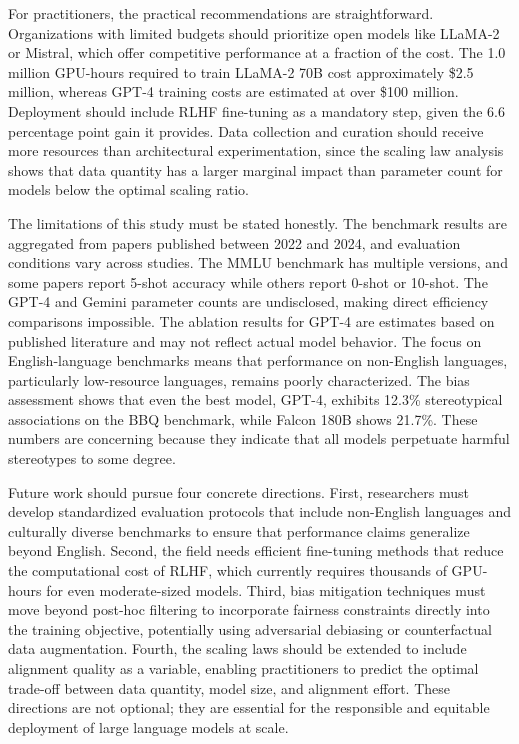 \documentclass[journal]{IEEEtran}
\begin{document}
For practitioners, the practical recommendations are straightforward. Organizations with limited budgets should prioritize open models like LLaMA-2 or Mistral, which offer competitive performance at a fraction of the cost. The 1.0 million GPU-hours required to train LLaMA-2 70B cost approximately \$2.5 million, whereas GPT-4 training costs are estimated at over \$100 million. Deployment should include RLHF fine-tuning as a mandatory step, given the 6.6 percentage point gain it provides. Data collection and curation should receive more resources than architectural experimentation, since the scaling law analysis shows that data quantity has a larger marginal impact than parameter count for models below the optimal scaling ratio.

The limitations of this study must be stated honestly. The benchmark results are aggregated from papers published between 2022 and 2024, and evaluation conditions vary across studies. The MMLU benchmark has multiple versions, and some papers report 5-shot accuracy while others report 0-shot or 10-shot. The GPT-4 and Gemini parameter counts are undisclosed, making direct efficiency comparisons impossible. The ablation results for GPT-4 are estimates based on published literature and may not reflect actual model behavior. The focus on English-language benchmarks means that performance on non-English languages, particularly low-resource languages, remains poorly characterized. The bias assessment shows that even the best model, GPT-4, exhibits 12.3\% stereotypical associations on the BBQ benchmark, while Falcon 180B shows 21.7\%. These numbers are concerning because they indicate that all models perpetuate harmful stereotypes to some degree.

Future work should pursue four concrete directions. First, researchers must develop standardized evaluation protocols that include non-English languages and culturally diverse benchmarks to ensure that performance claims generalize beyond English. Second, the field needs efficient fine-tuning methods that reduce the computational cost of RLHF, which currently requires thousands of GPU-hours for even moderate-sized models. Third, bias mitigation techniques must move beyond post-hoc filtering to incorporate fairness constraints directly into the training objective, potentially using adversarial debiasing or counterfactual data augmentation. Fourth, the scaling laws should be extended to include alignment quality as a variable, enabling practitioners to predict the optimal trade-off between data quantity, model size, and alignment effort. These directions are not optional; they are essential for the responsible and equitable deployment of large language models at scale.
\end{document}
